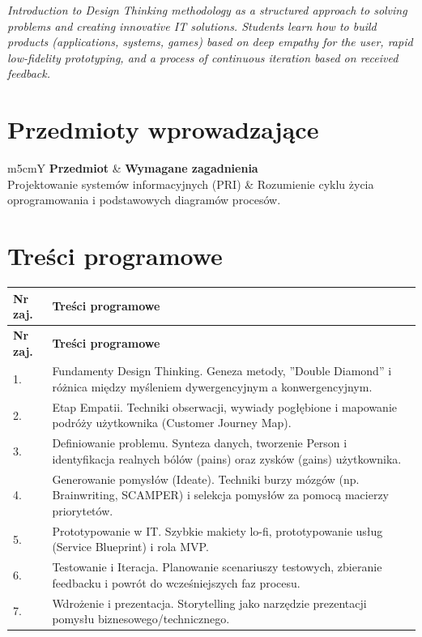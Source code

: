 \documentclass[12pt, a4paper]{article}
\newcommand{\thdrule}{\noalign{\global\setlength{\extrarowheight}{0pt}}}
\newcommand{\thdend}{\noalign{\global\setlength{\extrarowheight}{3pt}}}
\begin{document}
\textit{Introduction to Design Thinking methodology as a structured approach to solving problems and creating innovative IT solutions. Students learn how to build products (applications, systems, games) based on deep empathy for the user, rapid low-fidelity prototyping, and a process of continuous iteration based on received feedback.}


\section{Przedmioty wprowadzające}

{\scriptsize
\begin{tabularx}{\textwidth}{m{5cm}Y}
\thdrule\toprule
{} {\color{white}\textbf{Przedmiot}} & {\color{white}\textbf{Wymagane zagadnienia}} \\
\midrule\thdend
   Projektowanie systemów informacyjnych (PRI) & Rozumienie cyklu życia oprogramowania i podstawowych diagramów procesów. \\
\bottomrule
\end{tabularx}}

\section{Treści programowe}

{\scriptsize
\begin{longtable}{m{1.5cm}m{14.5cm}}
\thdrule\toprule
\rowcolor{pjatkRed} {\color{white}\textbf{Nr zaj.}} & {\color{white}\textbf{Treści programowe}} \\
\midrule\thdend
\endfirsthead
\thdrule\toprule
\rowcolor{pjatkRed} {\color{white}\textbf{Nr zaj.}} & {\color{white}\textbf{Treści programowe}} \\
\midrule\thdend
\endhead
  \rowcolor{tableRowLight} 1. & Fundamenty Design Thinking. Geneza metody, ''Double Diamond'' i różnica między myśleniem dywergencyjnym a konwergencyjnym. \\
  \rowcolor{tableRowAlt} 2. & Etap Empatii. Techniki obserwacji, wywiady pogłębione i mapowanie podróży użytkownika (Customer Journey Map). \\
  \rowcolor{tableRowLight} 3. & Definiowanie problemu. Synteza danych, tworzenie Person i identyfikacja realnych bólów (pains) oraz zysków (gains) użytkownika. \\
  \rowcolor{tableRowAlt} 4. & Generowanie pomysłów (Ideate). Techniki burzy mózgów (np. Brainwriting, SCAMPER) i selekcja pomysłów za pomocą macierzy priorytetów. \\
  \rowcolor{tableRowLight} 5. & Prototypowanie w IT. Szybkie makiety lo-fi, prototypowanie usług (Service Blueprint) i rola MVP. \\
  \rowcolor{tableRowAlt} 6. & Testowanie i Iteracja. Planowanie scenariuszy testowych, zbieranie feedbacku i powrót do wcześniejszych faz procesu. \\
  \rowcolor{tableRowLight} 7. & Wdrożenie i prezentacja. Storytelling jako narzędzie prezentacji pomysłu biznesowego/technicznego. \\
\bottomrule
\end{longtable}}
\end{document}
